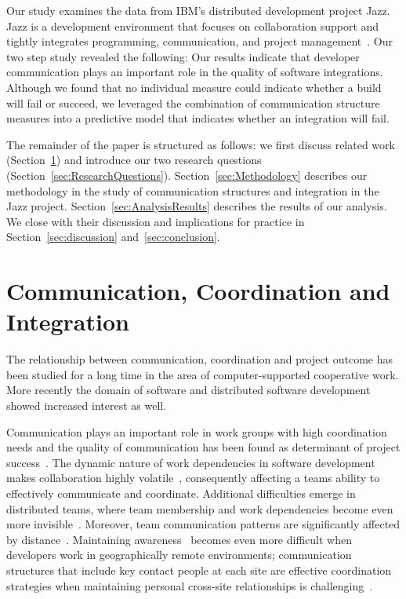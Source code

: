 \documentclass[12pt,oneside]{book}
\begin{document}
Our study examines the data from IBM's distributed development project Jazz. Jazz
is a development environment that focuses on collaboration support and tightly
integrates programming, communication, and project
management~\cite{frost:ieeesoftware:2007}. Our two step study revealed the following: Our
results indicate that developer communication plays an important role in the
quality of software integrations. Although we found that no individual measure
could indicate whether a build will fail or succeed, we leveraged the combination
of communication structure measures into a predictive model that indicates
whether an integration will fail.

The remainder of the paper is structured as follows: we first discuss related
work (Section~\ref{sec:RelatedCommunication}) and introduce our two research
questions (Section~\ref{sec:ResearchQuestions}). Section~\ref{sec:Methodology}
describes our methodology in the study of communication structures and
integration in the Jazz project. Section~\ref{sec:AnalysisResults} describes the
results of our analysis. We close with their discussion and implications for
practice in Section~\ref{sec:discussion} and~\ref{sec:conclusion}.



\section{Communication, Coordination and Integration}
\label{sec:RelatedCommunication}

The relationship between communication, coordination and project outcome has been
studied for a long time in the area of computer-supported cooperative work. More
recently the domain of software and distributed software development showed
increased interest as well.

Communication plays an important role in work groups with high coordination needs
and the quality of communication has been found as determinant of project
success~\cite{curtis:acm:1988,kraut:1995coordination}. The dynamic nature
of work dependencies in software development makes collaboration highly
volatile~\cite{Cataldo:2007hb}, consequently affecting a teams ability to
effectively communicate and coordinate. Additional difficulties emerge in
distributed teams, where team membership and work dependencies become even more
invisible~\cite{damian:icgse:2007}. Moreover, team communication patterns are
significantly affected by distance~\cite{hinds:cscw:2006}. Maintaining
awareness~\cite{sarma:2006icgse} becomes even more difficult when developers work
in geographically remote environments; communication structures that include key
contact people at each site are effective coordination strategies when
maintaining personal cross-site relationships is challenging~\cite{hinds:cscw:2006}.
\end{document}
